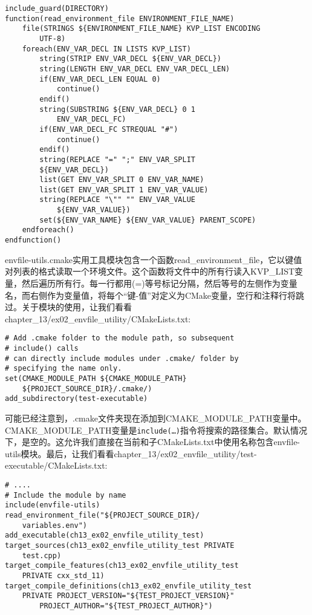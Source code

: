 \begin{lstlisting}[style=styleCMake]
include_guard(DIRECTORY)
function(read_environment_file ENVIRONMENT_FILE_NAME)
	file(STRINGS ${ENVIRONMENT_FILE_NAME} KVP_LIST ENCODING
		UTF-8)
	foreach(ENV_VAR_DECL IN LISTS KVP_LIST)
		string(STRIP ENV_VAR_DECL ${ENV_VAR_DECL})
		string(LENGTH ENV_VAR_DECL ENV_VAR_DECL_LEN)
		if(ENV_VAR_DECL_LEN EQUAL 0)
			continue()
		endif()
		string(SUBSTRING ${ENV_VAR_DECL} 0 1
			ENV_VAR_DECL_FC)
		if(ENV_VAR_DECL_FC STREQUAL "#")
			continue()
		endif()
		string(REPLACE "=" ";" ENV_VAR_SPLIT
		${ENV_VAR_DECL})
		list(GET ENV_VAR_SPLIT 0 ENV_VAR_NAME)
		list(GET ENV_VAR_SPLIT 1 ENV_VAR_VALUE)
		string(REPLACE "\"" "" ENV_VAR_VALUE
			${ENV_VAR_VALUE})
		set(${ENV_VAR_NAME} ${ENV_VAR_VALUE} PARENT_SCOPE)
	endforeach()
endfunction()
\end{lstlisting}

envfile-utils.cmake实用工具模块包含一个函数read\_environment\_file，它以键值对列表的格式读取一个环境文件。这个函数将文件中的所有行读入KVP\_LIST变量，然后遍历所有行。每一行都用(=)等号标记分隔，然后等号的左侧作为变量名，而右侧作为变量值，将每个“键-值”对定义为CMake变量，空行和注释行将跳过。关于模块的使用，让我们看看chapter\_13/ex02\_envfile\_utility/CMakeLists.txt:

\begin{lstlisting}[style=styleCMake]
# Add .cmake folder to the module path, so subsequent 
# include() calls
# can directly include modules under .cmake/ folder by
# specifying the name only.
set(CMAKE_MODULE_PATH ${CMAKE_MODULE_PATH}
	${PROJECT_SOURCE_DIR}/.cmake/)
add_subdirectory(test-executable)
\end{lstlisting}

可能已经注意到，.cmake文件夹现在添加到CMAKE\_MODULE\_PATH变量中。CMAKE\_MODULE\_PATH变量是\texttt{include(…)}指令将搜索的路径集合。默认情况下，是空的。这允许我们直接在当前和子CMakeLists.txt中使用名称包含envfile-utils模块。最后，让我们看看chapter\_13/ex02\_envfile\_utility/test-executable/CMakeLists.txt:

\begin{lstlisting}[style=styleCMake]
# ....
# Include the module by name
include(envfile-utils)
read_environment_file("${PROJECT_SOURCE_DIR}/
	variables.env")
add_executable(ch13_ex02_envfile_utility_test)
target_sources(ch13_ex02_envfile_utility_test PRIVATE
	test.cpp)
target_compile_features(ch13_ex02_envfile_utility_test
	PRIVATE cxx_std_11)
target_compile_definitions(ch13_ex02_envfile_utility_test
	PRIVATE PROJECT_VERSION="${TEST_PROJECT_VERSION}"
		PROJECT_AUTHOR="${TEST_PROJECT_AUTHOR}")
\end{lstlisting}

